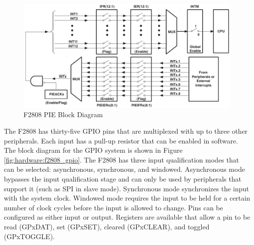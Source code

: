 \begin{figure}[ptb]
	\begin{centering}
		\includegraphics[scale=0.75]{Hardware/Figures/hardware-f2808_pie.pdf}
		\caption[F2808 PIE Block Diagram]{F2808 PIE Block Diagram\cite{ref:2006-ti-f2808_system_control_and_interrupts}}
		\label{fig:hardware:f2808_pie}
	\end{centering}
\end{figure}

The F2808 has thirty-five GPIO pins that are multiplexed with up to three other peripherals. Each input has a pull-up resistor that can be enabled in software. The block diagram for the GPIO system is shown in Figure \ref{fig:hardware:f2808_gpio}. The F2808 has three input qualification modes that can be selected: asynchronous, synchronous, and windowed. Asynchronous mode bypasses the input qualification stage and can only be used by peripherals that support it (such as SPI in slave mode). Synchronous mode synchronizes the input with the system clock. Windowed mode requires the input to be held for a certain number of clock cycles before the input is allowed to change. Pins can be configured as either input or output. Registers are available that allow a pin to be read (GPxDAT), set (GPxSET), cleared (GPxCLEAR), and toggled (GPxTOGGLE).


